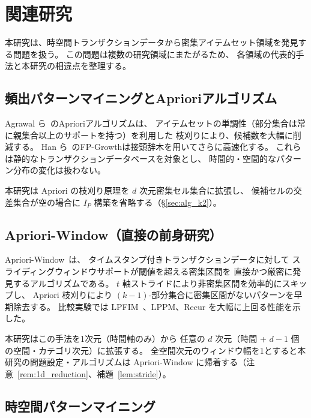 \section{関連研究}\label{sec:related}

本研究は、時空間トランザクションデータから密集アイテムセット領域を発見する問題を扱う。
この問題は複数の研究領域にまたがるため、
各領域の代表的手法と本研究の相違点を整理する。

\subsection{頻出パターンマイニングとAprioriアルゴリズム}

Agrawal ら~\cite{agrawal1994apriori}のAprioriアルゴリズムは、
アイテムセットの単調性（部分集合は常に親集合以上のサポートを持つ）を利用した
枝刈りにより、候補数を大幅に削減する。
Han ら~\cite{han2000mining}のFP-Growthは接頭辞木を用いてさらに高速化する。
これらは静的なトランザクションデータベースを対象とし、
時間的・空間的なパターン分布の変化は扱わない。

本研究は Apriori の枝刈り原理を $d$ 次元密集セル集合に拡張し、
候補セルの交差集合が空の場合に $I_P$ 構築を省略する（\S\ref{sec:alg_k2}）。

\subsection{Apriori-Window（直接の前身研究）}

Apriori-Window~\cite{aprioriwindow}は、
タイムスタンプ付きトランザクションデータに対して
スライディングウィンドウサポートが閾値を超える密集区間を
直接かつ厳密に発見するアルゴリズムである。
$t$ 軸ストライドにより非密集区間を効率的にスキップし、
Apriori 枝刈りにより $(k{-}1)$-部分集合に密集区間がないパターンを早期除去する。
比較実験では LPFIM~\cite{han2000mining}、LPPM、Recur を大幅に上回る性能を示した。

本研究はこの手法を1次元（時間軸のみ）から
任意の $d$ 次元（時間 + $d{-}1$ 個の空間・カテゴリ次元）に拡張する。
全空間次元のウィンドウ幅を1とすると本研究の問題設定・アルゴリズムは
Apriori-Window に帰着する（注意~\ref{rem:1d_reduction}、補題~\ref{lem:stride}）。

\subsection{時空間パターンマイニング}

